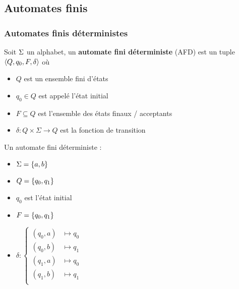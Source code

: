 \subsection{Automates finis}

\subsubsection{Automates finis déterministes}

\begin{definition}
	Soit $\Sigma$ un alphabet, un \textbf{automate fini déterministe} (AFD) est un tuple $\langle Q, q_0, F, \delta \rangle$ où
	\begin{itemize}
		\item $Q$ est un ensemble fini d'états
		\item $q_0 \in Q$ est appelé l'état initial
		\item $F \subseteq Q$ est l'ensemble des états finaux / acceptants
		\item $\delta : Q \times \Sigma \to Q$ est la fonction de transition
	\end{itemize}
\end{definition}


\begin{exemple} Un automate fini déterministe :

	\vspace{0.5cm}
	\begin{minipage}{0.5\textwidth}
		\begin{itemize}
			\item $\Sigma = \left\{a, b\right\}$
			\item $Q = \left\{q_0, q_1\right\}$
			\item $q_0$ est l'état initial
			\item $F = \left\{q_0, q_1\right\}$
			\item $\delta :
				      \left\{
				      \begin{array}{cc}
					      (q_0, a) & \mapsto q_0 \\
					      (q_0, b) & \mapsto q_1 \\
					      (q_1, a) & \mapsto q_0 \\
					      (q_1, b) & \mapsto q_1 \\
				      \end{array}
				      \right.$
		\end{itemize}
	\end{minipage}
	\begin{minipage}{0.5\textwidth}
	\end{minipage}
\end{exemple}

